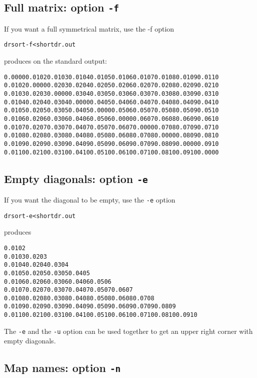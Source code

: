 \documentclass[%
	11pt,
        a4paper,
        twoside]{workrep}
\newcommand*{\opt}[1]{\texttt{#1}}		%
\begin{document}
\subsection{Full matrix: option \opt{-f}}

If you want a full symmetrical matrix, use the -f option
\begin{alltt}
  drsort -f < shortdr.out
\end{alltt}
produces on the standard output:
\begin{alltt}\small
 0.0000 0.0102 0.0103 0.0104 0.0105 0.0106 0.0107 0.0108 0.0109 0.0110
 0.0102 0.0000 0.0203 0.0204 0.0205 0.0206 0.0207 0.0208 0.0209 0.0210
 0.0103 0.0203 0.0000 0.0304 0.0305 0.0306 0.0307 0.0308 0.0309 0.0310
 0.0104 0.0204 0.0304 0.0000 0.0405 0.0406 0.0407 0.0408 0.0409 0.0410
 0.0105 0.0205 0.0305 0.0405 0.0000 0.0506 0.0507 0.0508 0.0509 0.0510
 0.0106 0.0206 0.0306 0.0406 0.0506 0.0000 0.0607 0.0608 0.0609 0.0610
 0.0107 0.0207 0.0307 0.0407 0.0507 0.0607 0.0000 0.0708 0.0709 0.0710
 0.0108 0.0208 0.0308 0.0408 0.0508 0.0608 0.0708 0.0000 0.0809 0.0810
 0.0109 0.0209 0.0309 0.0409 0.0509 0.0609 0.0709 0.0809 0.0000 0.0910
 0.0110 0.0210 0.0310 0.0410 0.0510 0.0610 0.0710 0.0810 0.0910 0.0000
\end{alltt}

\subsection{Empty diagonals: option \opt{-e}}

If you want the diagonal to be empty, use the \opt{-e} option
\begin{alltt}
 drsort -e < shortdr.out
\end{alltt}
produces
\begin{alltt}\small
 0.0102
 0.0103 0.0203
 0.0104 0.0204 0.0304
 0.0105 0.0205 0.0305 0.0405
 0.0106 0.0206 0.0306 0.0406 0.0506
 0.0107 0.0207 0.0307 0.0407 0.0507 0.0607
 0.0108 0.0208 0.0308 0.0408 0.0508 0.0608 0.0708
 0.0109 0.0209 0.0309 0.0409 0.0509 0.0609 0.0709 0.0809
 0.0110 0.0210 0.0310 0.0410 0.0510 0.0610 0.0710 0.0810 0.0910
\end{alltt}
The \opt{-e} and the \opt{-u} option can be used together to get an
upper right corner with empty diagonals.

\subsection{Map names: option \opt{-n}}
\end{document}
